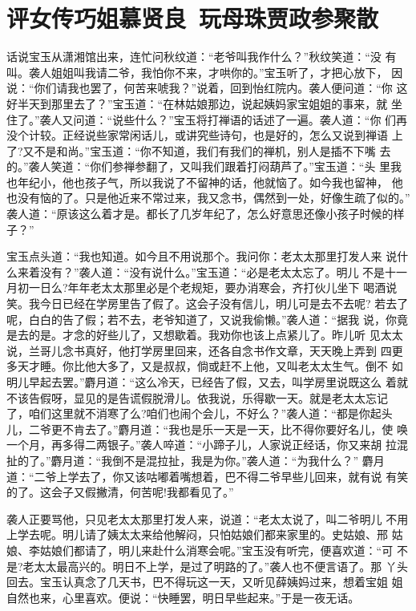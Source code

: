 \chapter{评女传巧姐慕贤良~玩母珠贾政参聚散}

话说宝玉从潇湘馆出来，连忙问秋纹道：“老爷叫我作什么？”秋纹笑道：“没
有叫。袭人姐姐叫我请二爷，我怕你不来，才哄你的。”宝玉听了，才把心放下，
因说：“你们请我也罢了，何苦来唬我？”说着，回到怡红院内。袭人便问道：“你
这好半天到那里去了？”宝玉道：“在林姑娘那边，说起姨妈家宝姐姐的事来，就
坐住了。”袭人又问道：“说些什么？”宝玉将打禅语的话述了一遍。袭人道：“你
们再没个计较。正经说些家常闲话儿，或讲究些诗句，也是好的，怎么又说到禅语
上了?又不是和尚。”宝玉道：“你不知道，我们有我们的禅机，别人是插不下嘴
去的。”袭人笑道：“你们参禅参翻了，又叫我们跟着打闷葫芦了。”宝玉道：“头
里我也年纪小，他也孩子气，所以我说了不留神的话，他就恼了。如今我也留神，
他也没有恼的了。只是他近来不常过来，我又念书，偶然到一处，好像生疏了似的。”
袭人道：“原该这么着才是。都长了几岁年纪了，怎么好意思还像小孩子时候的样
子？”

宝玉点头道：“我也知道。如今且不用说那个。我问你：老太太那里打发人来
说什么来着没有？”袭人道：“没有说什么。”宝玉道：“必是老太太忘了。明儿
不是十一月初一日么?年年老太太那里必是个老规矩，要办消寒会，齐打伙儿坐下
喝酒说笑。我今日已经在学房里告了假了。这会子没有信儿，明儿可是去不去呢?
若去了呢，白白的告了假；若不去，老爷知道了，又说我偷懒。”袭人道：“据我
说，你竟是去的是。才念的好些儿了，又想歇着。我劝你也该上点紧儿了。昨儿听
见太太说，兰哥儿念书真好，他打学房里回来，还各自念书作文章，天天晚上弄到
四更多天才睡。你比他大多了，又是叔叔，倘或赶不上他，又叫老太太生气。倒不
如明儿早起去罢。”麝月道：“这么冷天，已经告了假，又去，叫学房里说既这么
着就不该告假呀，显见的是告谎假脱滑儿。依我说，乐得歇一天。就是老太太忘记
了，咱们这里就不消寒了么?咱们也闹个会儿，不好么？”袭人道：“都是你起头
儿，二爷更不肯去了。”麝月道：“我也是乐一天是一天，比不得你要好名儿，使
唤一个月，再多得二两银子。”袭人啐道：“小蹄子儿，人家说正经话，你又来胡
拉混扯的了。”麝月道：“我倒不是混拉扯，我是为你。”袭人道：“为我什么？”
麝月道：“二爷上学去了，你又该咕嘟着嘴想着，巴不得二爷早些儿回来，就有说
有笑的了。这会子又假撇清，何苦呢!我都看见了。”

袭人正要骂他，只见老太太那里打发人来，说道：“老太太说了，叫二爷明儿
不用上学去呢。明儿请了姨太太来给他解闷，只怕姑娘们都来家里的。史姑娘、邢
姑娘、李姑娘们都请了，明儿来赴什么消寒会呢。”宝玉没有听完，便喜欢道：“可
不是?老太太最高兴的。明日不上学，是过了明路的了。”袭人也不便言语了。那
丫头回去。宝玉认真念了几天书，巴不得玩这一天，又听见薛姨妈过来，想着宝姐
姐自然也来，心里喜欢。便说：“快睡罢，明日早些起来。”于是一夜无话。

